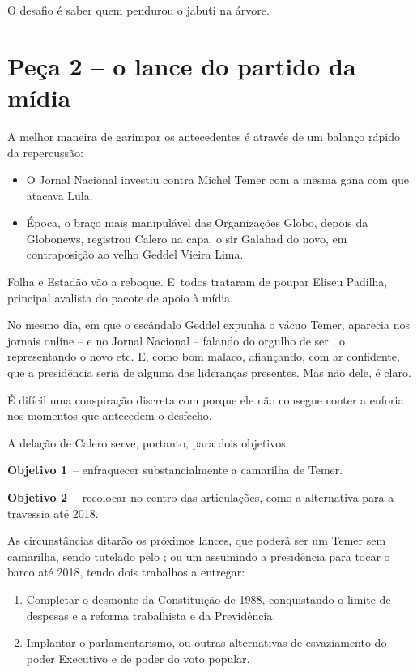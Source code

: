O desafio é saber quem pendurou o jabuti na árvore.

\section{Peça 2 -- o lance do partido da mídia}

A melhor maneira de garimpar os antecedentes é através de um balanço
rápido da repercussão:

\begin{itemize}
\itemsep1pt\parskip0pt
\item
  O Jornal Nacional investiu contra Michel Temer com a mesma gana com
  que atacava Lula.
\item
  Época, o braço mais manipulável das Organizações Globo, depois da
  Globonews, registrou Calero na capa, o sir Galahad do novo, em
  contraposição ao velho Geddel Vieira Lima.
\end{itemize}

Folha e Estadão vão a reboque. E~todos trataram de poupar Eliseu
Padilha, principal avalista do pacote de apoio à mídia.

No mesmo dia, em que o escândalo Geddel expunha o vácuo Temer, 
aparecia nos jornais online -- e no Jornal Nacional -- falando do
orgulho de ser , o  representando o novo etc. E, como bom
malaco, afiançando, com ar confidente, que a presidência seria de alguma
das lideranças presentes. Mas não dele, é claro.

É difícil uma conspiração discreta com  porque ele não consegue
conter a euforia nos momentos que antecedem o desfecho.

A delação de Calero serve, portanto, para dois objetivos:

\textbf{Objetivo 1}~-- enfraquecer substancialmente a camarilha de
Temer.

\textbf{Objetivo 2}~-- recolocar  no centro das articulações, como a
alternativa para a travessia até 2018.

As circunstâncias ditarão os próximos lances, que poderá ser um Temer
sem camarilha, sendo tutelado pelo ; ou um  assumindo a
presidência para tocar o barco até 2018, tendo dois trabalhos a
entregar:

\begin{enumerate}
\itemsep1pt\parskip0pt
\item
  Completar o desmonte da Constituição de 1988, conquistando o limite de
  despesas e a reforma trabalhista e da Previdência.
\item
  Implantar o parlamentarismo, ou outras alternativas de esvaziamento do
  poder Executivo e de poder do voto popular.
\end{enumerate}

